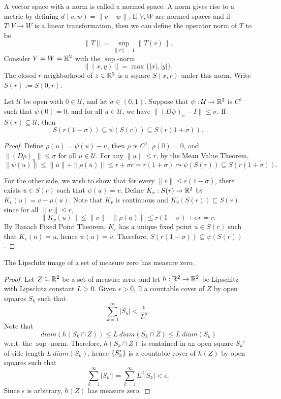 A vector space with a norm is called a normed space. A norm gives rise to a metric by defining $d(v, w) = \|v - w\|.$ If $V, W$ are normed spaces and if $T: V \to W$ is a linear transformation, then we can define the operator norm of $T$ to be
\[
\|T\| = \sup_{\|v\| = 1} \|T(v)\|.
\]
Consider $V = W = {\mathbb R}^2$ with the $\sup$-norm
\[
\|(x, y)\| = \max\{|x|, |y|\}.
\]
The closed $r$-neighborhood of $z \in {\mathbb R}^2$ is a square $S(x, r)$ under this norm. Write $S(r) := S(0, r)$.

\begin{lm}
    \label{lm:perturbation_of_identity}
    Let $\mathcal U$ be open with $0 \in \mathcal U$, and let $\sigma \in (0, 1)$. Suppose that $\psi: \mathcal U \to {\mathbb R}^2$ is $C^1$ such that $\psi(0) = 0$, and for all $u \in \mathcal U$, we have $\|(D\psi)_u - I\| \leq \sigma$. If $S(r) \subseteq \mathcal U$, then
    \[
    S(r(1 - \sigma)) \subseteq \psi(S(r)) \subseteq S(r(1 + \sigma)).
    \]
    \begin{proof}
        Define $\rho(u) = \psi(u) - u$, then $\rho$ is $C^1$, $\rho(0) = 0$, and $\|(D\rho)_u\| \leq \sigma$ for all $u \in \mathcal U$. For any $\|u\| \leq r$, by the Mean Value Theorem, 
        \[
        \|\psi(u)\| \leq \|u\| + \|\rho(u)\| \leq r + \sigma r = r(1 + \sigma) \leadsto \psi(S(r)) \subseteq S(r(1 + \sigma)).
        \]

        For the other side, we wish to show that for every $\|v\| \leq r(1 - \sigma)$, there exists $u \in S(r)$ such that $\psi(u) = v$. Define $K_v: S(r) \to {\mathbb R}^2$ by $K_v(u) = v - \rho(u)$. Note that $K_v$ is continuous and $K_v(S(r)) \subseteq S(r)$ since for all $\|u\| \leq r$,
        \[
        \|K_v(u)\| \leq \|v\| + \|\rho(u)\| \leq r(1 - \sigma) + \sigma r = r.
        \]
        By Banach Fixed Point Theorem, $K_v$ has a unique fixed point $u \in S(r)$ such that $K_v(u) = u$, hence $\psi(u) = v$. Therefore, $S(r(1 - \sigma)) \subseteq \psi(S(r))$.
    \end{proof}
\end{lm}

\begin{lm}
    \label{lm:lipschitz_measure_zero}
    The Lipschitz image of a set of measure zero has measure zero.
    \begin{proof}
        Let $Z \subseteq {\mathbb R}^2$ be a set of measure zero, and let $h: {\mathbb R}^2 \to {\mathbb R}^2$ be Lipschitz with Lipschitz constant $L > 0$. Given $\epsilon > 0$, $\exists$ a countable cover of $Z$ by open squares $S_k$ such that
        \[
        \sum_{k=1}^\infty |S_k| < \frac{\epsilon}{L^2}.
        \]
        Note that
        \[
        ~diam (h(S_k \cap Z)) \leq L ~diam (S_k \cap Z) \leq L ~diam (S_k)
        \]
        w.r.t. the $\sup$-norm. Therefore, $h(S_k \cap Z)$ is contained in an open square $S_k'$ of side length $L ~diam (S_k)$, hence ${\left\{{S_k'}\right\}}$ is a countable cover of $h(Z)$ by open squares such that
        \[
        \sum_{k=1}^\infty |S_k'| = \sum_{k=1}^\infty L^2 |S_k| < \epsilon.
        \]
        Since $\epsilon$ is arbitrary, $h(Z)$ has measure zero.
    \end{proof}
\end{lm}

